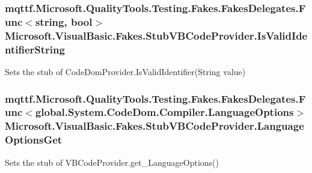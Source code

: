 \hypertarget{class_microsoft_1_1_visual_basic_1_1_fakes_1_1_stub_v_b_code_provider_a9a5d16fdd964d212aa97a4d515fced60}{
\subsubsection[{Is\-Valid\-Identifier\-String}]{\setlength{\rightskip}{0pt plus 5cm}mqttf.\-Microsoft.\-Quality\-Tools.\-Testing.\-Fakes.\-Fakes\-Delegates.\-Func$<$string, bool$>$ Microsoft.\-Visual\-Basic.\-Fakes.\-Stub\-V\-B\-Code\-Provider.\-Is\-Valid\-Identifier\-String}}\label{class_microsoft_1_1_visual_basic_1_1_fakes_1_1_stub_v_b_code_provider_a9a5d16fdd964d212aa97a4d515fced60}


Sets the stub of Code\-Dom\-Provider.\-Is\-Valid\-Identifier(\-String value)

\hypertarget{class_microsoft_1_1_visual_basic_1_1_fakes_1_1_stub_v_b_code_provider_aa22c00534da7a62234c4d8e909da02e0}{
\subsubsection[{Language\-Options\-Get}]{\setlength{\rightskip}{0pt plus 5cm}mqttf.\-Microsoft.\-Quality\-Tools.\-Testing.\-Fakes.\-Fakes\-Delegates.\-Func$<$global.\-System.\-Code\-Dom.\-Compiler.\-Language\-Options$>$ Microsoft.\-Visual\-Basic.\-Fakes.\-Stub\-V\-B\-Code\-Provider.\-Language\-Options\-Get}}\label{class_microsoft_1_1_visual_basic_1_1_fakes_1_1_stub_v_b_code_provider_aa22c00534da7a62234c4d8e909da02e0}


Sets the stub of V\-B\-Code\-Provider.\-get\-\_\-\-Language\-Options()

